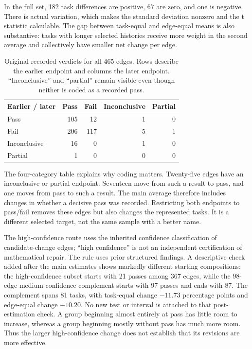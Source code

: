In the full set, 182 task differences are positive, 67 are zero, and one is negative. There is actual variation, which makes the standard deviation nonzero and the t statistic calculable. The gap between task-equal and edge-equal means is also substantive: tasks with longer selected histories receive more weight in the second average and collectively have smaller net change per edge.

\begin{table}[htbp]
\centering\small
\caption{Original recorded verdicts for all 465 edges. Rows describe the earlier endpoint and columns the later endpoint. ``Inconclusive'' and ``partial'' remain visible even though neither is coded as a recorded pass.}
\label{tab:labels}
\begin{tabular}{lrrrr}
\toprule
Earlier / later & Pass & Fail & Inconclusive & Partial \\
\midrule
Pass & 105 & 12 & 1 & 0 \\
Fail & 206 & 117 & 5 & 1 \\
Inconclusive & 16 & 0 & 1 & 0 \\
Partial & 1 & 0 & 0 & 0 \\
\bottomrule
\end{tabular}
\end{table}

The four-category table explains why coding matters. Twenty-five edges have an inconclusive or partial endpoint. Seventeen move from such a result to pass, and one moves from pass to such a result. The main average therefore includes changes in whether a decisive pass was recorded. Restricting both endpoints to pass/fail removes these edges but also changes the represented tasks. It is a different selected target, not the same sample with a better name.

The high-confidence route uses the inherited confidence classification of candidate-change edges; ``high confidence'' is not an independent certification of mathematical repair. The rule uses prior structured findings. A descriptive check added after the main estimates shows markedly different starting compositions: the high-confidence subset starts with 21 passes among 367 edges, while the 98-edge medium-confidence complement starts with 97 passes and ends with 87. The complement spans 81 tasks, with task-equal change $-11.73$ percentage points and edge-equal change $-10.20$. No new test or interval is attached to that post-estimation check. A group beginning almost entirely at pass has little room to increase, whereas a group beginning mostly without pass has much more room. Thus the larger high-confidence change does not establish that its revisions are more effective.

